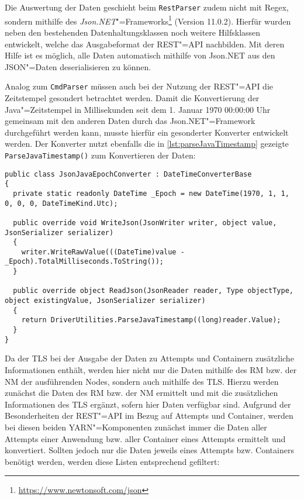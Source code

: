 Die Auswertung der Daten geschieht beim \texttt{RestParser} zudem nicht mit Regex, sondern mithilfe des \emph{Json.NET}"=Frameworks\footnote{\url{https://www.newtonsoft.com/json}} (Version 11.0.2).
Hierfür wurden neben den bestehenden Datenhaltungsklassen noch weitere Hilfsklassen entwickelt, welche das Ausgabeformat der REST"=API nachbilden.
Mit deren Hilfe ist es möglich, alle Daten automatisch mithilfe von Json.NET aus den JSON"=Daten deserialisieren zu können.

Analog zum \texttt{CmdParser} müssen auch bei der Nutzung der REST"=API die Zeitstempel gesondert betrachtet werden.
Damit die Konvertierung der Java"=Zeitstempel in Millisekunden seit dem 1. Januar 1970 00:00:00 Uhr gemeinsam mit den anderen Daten durch das Json.NET"=Framework durchgeführt werden kann, musste hierfür ein gesonderter Konverter entwickelt werden.
Der Konverter nutzt ebenfalls die in \cref{lst:parseJavaTimestamp} gezeigte \texttt{ParseJavaTimestamp()} zum Konvertieren der Daten:

\begin{lstlisting}[label=lst:javaEpochConverter,style=cs,
caption={[Entwickelter Konverter für Java"=Zeitstempel zur Nutzung mit Json.NET]
    Entwickelter Konverter für Java"=Zeitstempel zur Nutzung mit Json.NET.
    Dieser erbt dafür von \texttt{DateTimeConverterBase} des Json.NET"=Frameworks, damit der \texttt{JsonJavaEpochConverter} auch zur Deserialisierung genutzt werden kann.}]
public class JsonJavaEpochConverter : DateTimeConverterBase
{
  private static readonly DateTime _Epoch = new DateTime(1970, 1, 1, 0, 0, 0, DateTimeKind.Utc);

  public override void WriteJson(JsonWriter writer, object value, JsonSerializer serializer)
  {
    writer.WriteRawValue(((DateTime)value - _Epoch).TotalMilliseconds.ToString());
  }
  
  public override object ReadJson(JsonReader reader, Type objectType, object existingValue, JsonSerializer serializer)
  {
    return DriverUtilities.ParseJavaTimestamp((long)reader.Value);
  }
}
\end{lstlisting}

Da der \ac{TLS} bei der Ausgabe der Daten zu Attempts und Containern zusätzliche Informationen enthält, werden hier nicht nur die Daten mithilfe des \ac{RM} bzw. der \ac{NM} der ausführenden Nodes, sondern auch mithilfe des \ac{TLS}.
Hierzu werden zunächst die Daten des \ac{RM} bzw. der \ac{NM} ermittelt und mit die zusätzlichen Informationen des \ac{TLS} ergänzt, sofern hier Daten verfügbar sind.
Aufgrund der Besonderheiten der REST"=API im Bezug auf Attempts und Container, werden bei diesen beiden \ac{YARN}"=Komponenten zunächst immer die Daten aller Attempts einer Anwendung bzw. aller Container eines Attempts ermittelt und konvertiert.
Sollten jedoch nur die Daten jeweils eines Attempts bzw. Containers benötigt werden, werden diese Listen entsprechend gefiltert:

